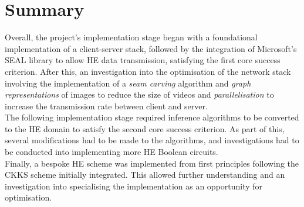 \setlength{\leftskip}{0cm}




\section{Summary}
\setlength{\leftskip}{0.25cm}
\indent \indent
Overall, the project's implementation stage began with a foundational implementation of a client-server stack, followed by the integration of Microsoft's SEAL library to allow HE data transmission, satisfying the first core success criterion. After this, an investigation into the optimisation of the network stack involving the implementation of a \textit{seam carving} algorithm and \textit{graph representations} of images to reduce the size of videos and \textit{parallelisation} to increase the transmission rate between client and server.
\smallskip \\ \indent
The following implementation stage required inference algorithms to be converted to the HE domain to satisfy the second core success criterion. As part of this, several modifications had to be made to the algorithms, and investigations had to be conducted into implementing more HE Boolean circuits. 
\smallskip \\ \indent
Finally, a bespoke HE scheme was implemented from first principles following the CKKS scheme initially integrated. This allowed further understanding and an investigation into specialising the implementation as an opportunity for optimisation.


\setlength{\leftskip}{0cm}
